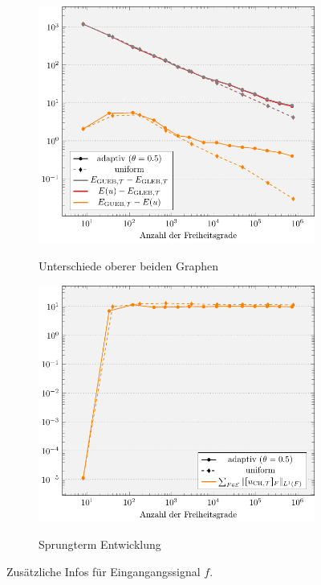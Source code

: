 \begin{figure}[p]
  \centering
  \begin{subfigure}[b]{.48\linewidth}
    \centering
    \caption{Unterschiede oberer beiden Graphen}
    \includegraphics[width=\linewidth]
      {pictures/chapExperiments/secExactSol/f01/energyDiffs.pdf}
    \label{fig:f01DiffGuebExactE}
  \end{subfigure}
  \quad
  \begin{subfigure}[b]{.48\linewidth}
    \centering
    \caption{Sprungterm Entwicklung}
    \includegraphics[width=\linewidth]
      {pictures/chapExperiments/secExactSol/f01/jumpTerms.pdf}
    \label{fig:f01JumpTerms}
  \end{subfigure}
  \caption{Zusätzliche Infos für Eingangangssignal $f$.}
  \label{fig:f01SupplementaryInfo}
\end{figure}
